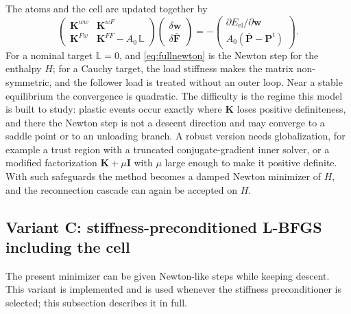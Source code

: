 \documentclass[11pt,a4paper]{article}
\newcommand{\Fb}{\bar{\mathbf F}}
\newcommand{\Pb}{\bar{\mathbf P}}
\newcommand{\Pt}{\mathbf P^{\mathrm t}}
\newcommand{\I}{\mathbf I}
\newcommand{\w}{\mathbf w}
\begin{document}
The atoms and the cell are updated together by
\begin{equation}
  \begin{pmatrix}\mathbf K^{ww}&\mathbf K^{wF}\\ \mathbf K^{Fw}&\mathbf K^{FF}-A_0\,\mathbb L\end{pmatrix}
  \begin{pmatrix}\delta\w\\ \delta\Fb\end{pmatrix}
  =-\begin{pmatrix}\partial E_{\mathrm{el}}/\partial\w\\ A_0(\Pb-\Pt)\end{pmatrix}.
  \label{eq:fullnewton}
\end{equation}
For a nominal target \(\mathbb L=0\), and \eqref{eq:fullnewton} is the Newton step for the enthalpy
\(H\); for a Cauchy target, the load stiffness makes the matrix non-symmetric, and the follower load
is treated without an outer loop. Near a stable equilibrium the convergence is quadratic. The
difficulty is the regime this model is built to study: plastic events occur exactly where \(\mathbf
K\) loses positive definiteness, and there the Newton step is not a descent direction and may
converge to a saddle point or to an unloading branch. A robust version needs globalization, for
example a trust region with a truncated conjugate-gradient inner solver, or a modified
factorization \(\mathbf K+\mu\I\) with \(\mu\) large enough to make it positive definite. With such
safeguards the method becomes a damped Newton minimizer of \(H\), and the reconnection cascade can
again be accepted on \(H\).

\subsection{Variant C: stiffness-preconditioned L-BFGS including the cell}
\label{sec:precond}

The present minimizer can be given Newton-like steps while keeping descent. This variant is
implemented and is used whenever the stiffness preconditioner is selected; this subsection
describes it in full.
\end{document}
